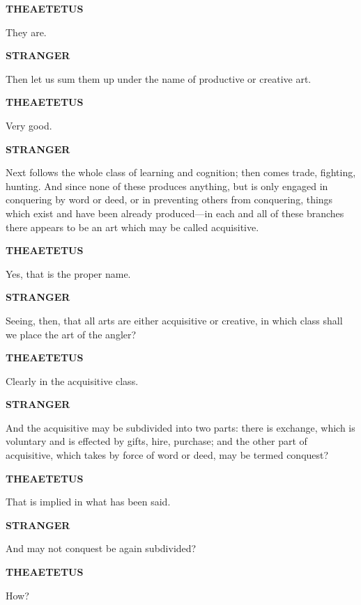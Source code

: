 \documentclass[11pt,letter]{article}
\begin{document}
\par \textbf{THEAETETUS}
\par   They are.

\par \textbf{STRANGER}
\par   Then let us sum them up under the name of productive or creative art.

\par \textbf{THEAETETUS}
\par   Very good.

\par \textbf{STRANGER}
\par   Next follows the whole class of learning and cognition; then comes trade, fighting, hunting. And since none of these produces anything, but is only engaged in conquering by word or deed, or in preventing others from conquering, things which exist and have been already produced—in each and all of these branches there appears to be an art which may be called acquisitive.

\par \textbf{THEAETETUS}
\par   Yes, that is the proper name.

\par \textbf{STRANGER}
\par   Seeing, then, that all arts are either acquisitive or creative, in which class shall we place the art of the angler?

\par \textbf{THEAETETUS}
\par   Clearly in the acquisitive class.

\par \textbf{STRANGER}
\par   And the acquisitive may be subdivided into two parts:  there is exchange, which is voluntary and is effected by gifts, hire, purchase; and the other part of acquisitive, which takes by force of word or deed, may be termed conquest?

\par \textbf{THEAETETUS}
\par   That is implied in what has been said.

\par \textbf{STRANGER}
\par   And may not conquest be again subdivided?

\par \textbf{THEAETETUS}
\par   How?
\end{document}
